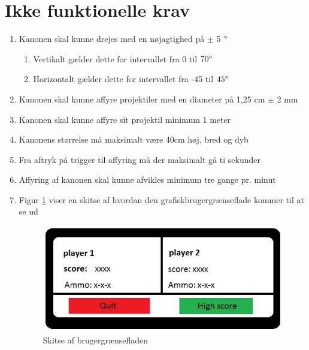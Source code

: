 \section{Ikke funktionelle krav}
\begin{enumerate}
	\item Kanonen skal kunne drejes med en nøjagtighed på \(\pm\) 5 \(\degree\)
		\begin{enumerate}
			\item Vertikalt gælder dette for intervallet fra 0 til \(70\degree\)
			\item Horizontalt gælder dette for intervallet fra -45 til \(45\degree\)
		\end{enumerate} 
	\item Kanonen skal kunne affyre projektiler med en diameter på 1,25 cm \(\pm\) 2 mm
	\item Kanonen skal kunne affyre sit projektil minimum 1 meter
	\item Kanonens størrelse må maksimalt være 40cm høj, bred og dyb
	\item Fra aftryk på trigger til affyring må der maksimalt gå ti sekunder
	\item Affyring af kanonen skal kunne afvikles minimum tre gange pr. minut
	\item Figur \ref{ref:brugergraesefladeskitse}  viser en skitse af hvordan den grafiskbrugergrænseflade kommer til at se ud
		\begin{figure}[h]
			\centering
			\includegraphics[width=\textwidth]{Kravspecifikation/images/brugergraensefladeskitse}
			\caption{Skitse af brugergrænsefladen}
			\label{ref:brugergraesefladeskitse}
		\end{figure}
\end{enumerate}